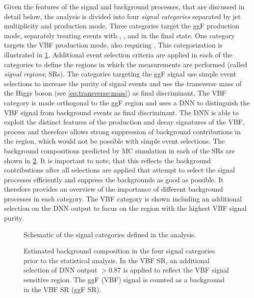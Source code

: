 Given the features of the signal and background processes, that are discussed in detail below, the analysis is divided into four \emph{signal categories} separated by jet multiplicity and production mode.
Three categories target the ggF production mode, separately treating events with \ZeroJet, \OneJet, and \TwoJet in the final state. One category targets the VBF production mode, also requiring \TwoJet. 
This categorization is illustrated in \cref{fig:signal-categorization}.
Additional event selection criteria are applied in each of the categories to define the regions in which the measurements are performed (called \emph{signal regions}; SRs).
The categories targeting the ggF signal use simple event selections to increase the purity of signal events and use the transverse mass of the Higgs boson (see \cref{eq:transverse-mass}) as final discriminant.
The VBF \TwoJet category is made orthogonal to the ggF \TwoJet region and uses a DNN to distinguish the VBF signal from background events as final discriminant.
The DNN is able to exploit the distinct features of the production and decay signatures of the VBF, \HWW process and therefore allows strong suppression of background contributions in the \TwoJet region, which would not be possible with simple event selections. 
The background compositions predicted by MC simulation in each of the SRs are shown in \cref{fig:bkg-composition}.
It is important to note, that this reflects the background contributions after all selections are applied that attempt to select the signal processes efficiently and suppress the backgrounds as good as possible. It therefore provides an overview of the importance of different background processes in each category.
The VBF \TwoJet category is shown including an additional selection on the DNN output to focus on the region with the highest VBF signal purity.
\begin{figure}[ht]
    \caption{Schematic of the signal categories defined in the \HWW analysis.}
    \label{fig:signal-categorization}
\end{figure}
\begin{figure}[h!]
     \hfill
    \caption[Estimated background composition in the four signal categories.]{Estimated background composition in the four signal categories prior to the statistical analysis. In the VBF \TwoJet SR, an additional selection of DNN output $>0.87$ is applied to reflect the VBF signal sensitive region. The ggF (VBF) signal is counted as a background in the VBF SR (ggF SR).}
    \label{fig:bkg-composition}
\end{figure}

